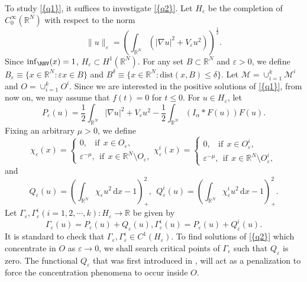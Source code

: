 \documentclass[12pt,reqno]{amsart}
\numberwithin{equation}{section}
\begin{document}
To study {\eqref{{q1}}}, it suffices to investigate {\eqref{{q2}}}. Let $H_{\varepsilon}$ be the completion of $C_0^{\infty}({\mathbb R^N})$ with respect to the norm
$$
\|u\|_{\varepsilon}=\left(\int_{\mathbb R^N} (|{\nabla} u|^2+V_{\varepsilon} u^2)\right)^{\frac{1}{2}}.
$$
Since $\inf_\RNV(x)=1$, $H_{\varepsilon}\subset H^1({\mathbb R^N})$. For any set $B\subset {\mathbb R^N}$ and ${\varepsilon}>0$, we define $B_{\varepsilon}\equiv\{x\in{\mathbb R^N}: {\varepsilon} x\in B\}$ and $B^{\delta}\equiv\{x\in{\mathbb R^N}: \mbox{dist}(x,B)\le{\delta}\}$. Let $\mathcal{M}=\cup_{i=1}^k\mathcal{M}^i$ and $O=\cup_{i=1}^k O^i$. Since we are interested in the positive solutions of {\eqref{{q1}}}, from now on, we may assume that $f(t)=0$ for $t \le0.$  \noindent For $u\in H_{\varepsilon}$, let
$$
P_{\varepsilon}(u)=\frac{1}{2}\int_{\mathbb R^N} |{\nabla} u|^2+V_{\varepsilon} u^2-\frac{1}{2}\int_{\mathbb R^N} (I_{\alpha}\ast F(u))F(u).
$$
Fixing an arbitrary $\mu>0$, we define
\begin{equation}
\chi_{\varepsilon}(x)=
\begin{cases}\nonumber
0,\ \ \ \ \mbox{if}\ \ x\in O_{\varepsilon},\\
\varepsilon^{-\mu},\ \ \mbox{if}\ \ x\in {\mathbb R^N}\setminus O_{\varepsilon},
\end{cases}
\chi_{\varepsilon}^i(x)=
\begin{cases}\nonumber
0,\ \ \ \ \mbox{if}\ \ x\in O_{\varepsilon}^i,\\
\varepsilon^{-\mu},\ \ \mbox{if}\ \ x\in {\mathbb R^N}\setminus O_{\varepsilon}^i,
\end{cases}
\end{equation}
and
$$
Q_{\varepsilon}(u)=\left(\int_{\mathbb R^N}\chi_{\varepsilon} u^2\, {\mathrm{d}} x-1\right)_+^2,\ \ Q_{\varepsilon}^i(u)=\left(\int_{\mathbb R^N}\chi_{\varepsilon}^i u^2\, {\mathrm{d}} x-1\right)_+^2.
$$
Let ${\Gamma}_{\varepsilon},{\Gamma}_{\varepsilon}^i(i=1,2,\cdots,k):H_{\varepsilon}{\rightarrow} {\mathbb R}$ be
given by $${\Gamma}_{\varepsilon}(u)=P_{\varepsilon}(u)+Q_{\varepsilon}(u),{\Gamma}_{\varepsilon}^i(u)=P_{\varepsilon}(u)+Q_{\varepsilon}^i(u).$$ It is standard to check that ${\Gamma}_{\varepsilon},{\Gamma}_{\varepsilon}^i\in
C^1(H_{\varepsilon})$. To find solutions of {\eqref{{q2}}} which concentrate in $O$ as ${\varepsilon}{\rightarrow} 0$, we shall search critical points of
${\Gamma}_{\varepsilon}$ such that $Q_{\varepsilon}$ is zero. The functional $Q_{\varepsilon}$ that was first introduced in \cite{BW}, will act as a penalization to force the concentration phenomena to occur inside $O$.
\end{document}
